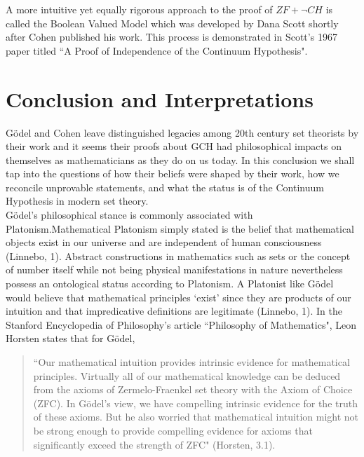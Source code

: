 \documentclass[10pt,letterpaper]{amsart}
\numberwithin{equation}{section}
\theoremstyle{plain}
\theoremstyle{definition}
\numberwithin{equation}{section}
\begin{document}
A more intuitive yet equally rigorous approach to the proof of $ZF+\neg CH$ is called the Boolean Valued Model which was developed by Dana Scott shortly after Cohen published his work. This process is demonstrated in Scott's 1967 paper titled ``A Proof of Independence of the Continuum Hypothesis".\\



\section{Conclusion and Interpretations}

Gödel and Cohen leave distinguished legacies among 20th century set theorists by their work and it seems their proofs about GCH had philosophical impacts on themselves as mathematicians as they do on us today. In this conclusion we shall tap into the questions of how their beliefs were shaped by their work, how we reconcile unprovable statements, and what the status is of the Continuum Hypothesis in modern set theory. \\

Gödel's philosophical stance is commonly associated with Platonism.\;Mathematical Platonism simply stated is the belief that mathematical objects exist in our universe and are independent of human consciousness (Linnebo, 1). Abstract constructions in mathematics such as sets or the concept of number itself while not being physical manifestations in nature nevertheless possess an ontological status according to Platonism. A Platonist like Gödel would believe that mathematical principles `exist' since they are products of our intuition and that impredicative definitions are legitimate (Linnebo, 1). In the Stanford Encyclopedia of Philosophy's article ``Philosophy of Mathematics", Leon Horsten states that for Gödel, 
\begin{quote}
``Our mathematical intuition provides intrinsic evidence for mathematical principles. Virtually all of our mathematical knowledge can be deduced from the axioms of Zermelo-Fraenkel set theory with the Axiom of Choice (ZFC). In Gödel’s view, we have compelling intrinsic evidence for the truth of these axioms. But he also worried that mathematical intuition might not be strong enough to provide compelling evidence for axioms that significantly exceed the strength of ZFC" (Horsten, 3.1).
\end{quote}
\end{document}
